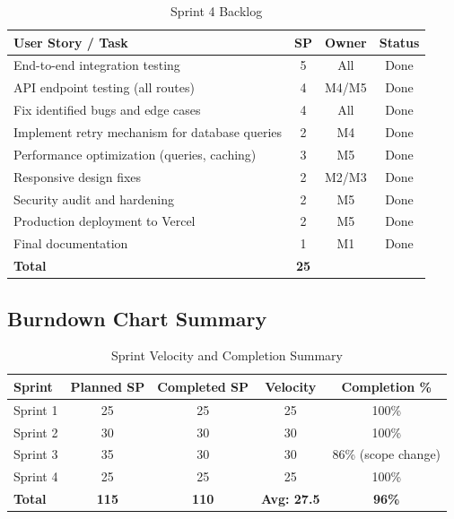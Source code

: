 \documentclass[12pt,a4paper]{article}
\begin{document}
\begin{table}[H]
\centering
\begin{tabularx}{\textwidth}{|X|c|c|c|}
\hline
\textbf{User Story / Task} & \textbf{SP} & \textbf{Owner} & \textbf{Status} \\
\hline
End-to-end integration testing & 5 & All & Done \\
\hline
API endpoint testing (all routes) & 4 & M4/M5 & Done \\
\hline
Fix identified bugs and edge cases & 4 & All & Done \\
\hline
Implement retry mechanism for database queries & 2 & M4 & Done \\
\hline
Performance optimization (queries, caching) & 3 & M5 & Done \\
\hline
Responsive design fixes & 2 & M2/M3 & Done \\
\hline
Security audit and hardening & 2 & M5 & Done \\
\hline
Production deployment to Vercel & 2 & M5 & Done \\
\hline
Final documentation & 1 & M1 & Done \\
\hline
\textbf{Total} & \textbf{25} & & \\
\hline
\end{tabularx}
\caption{Sprint 4 Backlog}
\end{table}

\subsection{Burndown Chart Summary}

\begin{table}[H]
\centering
\begin{tabular}{|l|c|c|c|c|}
\hline
\textbf{Sprint} & \textbf{Planned SP} & \textbf{Completed SP} & \textbf{Velocity} & \textbf{Completion \%} \\
\hline
Sprint 1 & 25 & 25 & 25 & 100\% \\
\hline
Sprint 2 & 30 & 30 & 30 & 100\% \\
\hline
Sprint 3 & 35 & 30 & 30 & 86\% (scope change) \\
\hline
Sprint 4 & 25 & 25 & 25 & 100\% \\
\hline
\textbf{Total} & \textbf{115} & \textbf{110} & \textbf{Avg: 27.5} & \textbf{96\%} \\
\hline
\end{tabular}
\caption{Sprint Velocity and Completion Summary}
\end{table}
\end{document}
